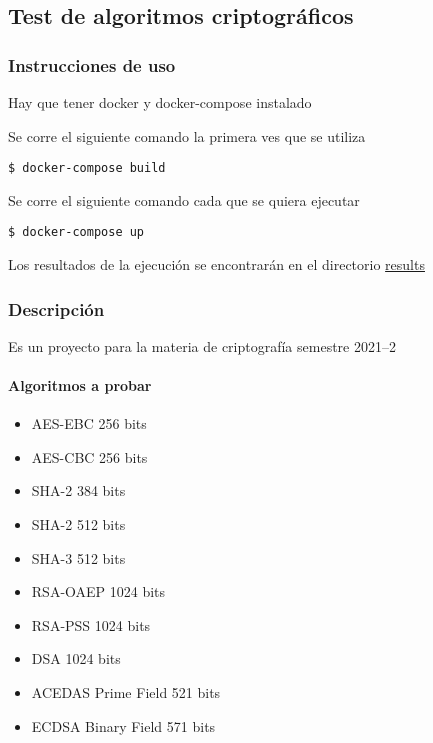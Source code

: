 \documentclass[../main.tex]{subfiles}
\begin{document}
\hypertarget{test-de-algoritmos-criptograficos}{%
  \subsection{Test de algoritmos
    criptográficos}\label{test-de-algoritmos-criptograficos}}

\hypertarget{instrucciones-de-uso}{%
  \subsubsection{Instrucciones de uso}\label{instrucciones-de-uso}}

Hay que tener docker y docker-compose instalado

Se corre el siguiente comando la primera ves que se utiliza


\begin{code}
\begin{verbatim}
$ docker-compose build
\end{verbatim}
\end{code}

Se corre el siguiente comando cada que se quiera ejecutar

\begin{code}
\begin{verbatim}
$ docker-compose up
\end{verbatim}
\end{code}

Los resultados de la ejecución se encontrarán en el directorio
\href{./results}{results}

\hypertarget{descripciuxf3n}{%
  \subsubsection{Descripción}\label{descripciuxf3n}}

Es un proyecto para la materia de criptografía semestre 2021--2

\hypertarget{algoritmos-a-probar}{%
  \paragraph{Algoritmos a probar}\label{algoritmos-a-probar}}

\begin{itemize}
        \tightlist{}
  \item AES-EBC 256 bits
  \item AES-CBC 256 bits
  \item SHA-2 384 bits
  \item SHA-2 512 bits
  \item SHA-3 512 bits
  \item RSA-OAEP 1024 bits
  \item RSA-PSS 1024 bits
  \item DSA 1024 bits
  \item ACEDAS Prime Field 521 bits
  \item ECDSA Binary Field 571 bits
\end{itemize}
\end{document}
